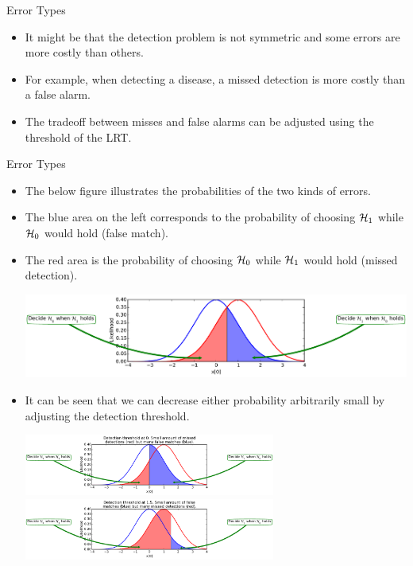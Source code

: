\documentclass[10pt, aspectratio=169]{beamer} %
\begin{document}
\begin{frame}[allowframebreaks=0.8]
 {Error Types}
\begin{itemize}
\item It might be that the detection problem is not symmetric and some
errors are more costly than others.
\item For example, when detecting a disease, a missed detection is more
costly than a false alarm. 
\item The tradeoff between misses and false alarms can be adjusted
using the threshold of the LRT.
\end{itemize}
\end{frame}

\begin{frame}[allowframebreaks=0.8]
 {Error Types}
\begin{itemize}

\item The below figure illustrates the probabilities of the two kinds of
errors. 
\item The blue area on the left corresponds to the probability of
choosing ${\cal H}_1$ while ${\cal H}_0$ would hold (false match). 
\item 
The red area is the probability
of choosing  ${\cal H}_0$ while ${\cal H}_1$ would hold (missed detection).

\centerline{\includegraphics[width=\textwidth]{errorTypes1.pdf}}


\item It can be seen that we can decrease either probability arbitrarily small
by adjusting the detection threshold.

\begin{center}
\includegraphics[width=0.65\textwidth]{errorTypes2.pdf}\\
\includegraphics[width=0.65\textwidth]{errorTypes3.pdf}
\end{center}
\end{itemize}
\end{frame}
\end{document}
